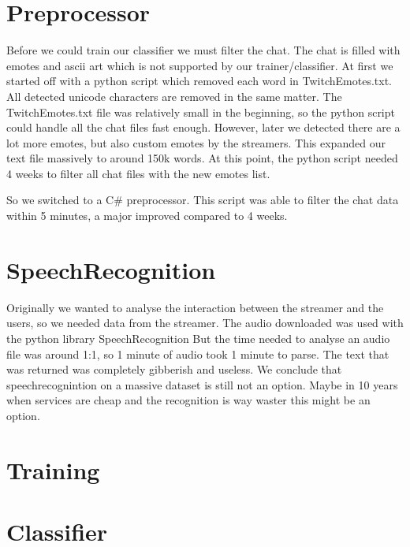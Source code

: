 \documentclass[final]{report}
\begin{document}
\section{Preprocessor}
Before we could train our classifier we must filter the chat. The chat is filled with emotes and ascii art which is not supported by our trainer/classifier.
At first we started off with a python script which removed each word in TwitchEmotes.txt. All detected unicode characters are removed in the same matter.
The TwitchEmotes.txt file was relatively small in the beginning, so the python script could handle all the chat files fast enough. However, later we detected there are a lot more emotes, but also custom emotes by the streamers.
This expanded our text file massively to around 150k words. At this point, the python script needed 4 weeks to filter all chat files with the new emotes list.

So we switched to a C# preprocessor.
This script was able to filter the chat data within 5 minutes, a major improved compared to 4 weeks.

\section{SpeechRecognition}
Originally we wanted to analyse the interaction between the streamer and the users, so we needed data from the streamer.
The audio downloaded was used with the python library SpeechRecognition %
But the time needed to analyse an audio file was around 1:1, so 1 minute of audio took 1 minute to parse. The text that was returned was completely gibberish and useless.
We conclude that speechrecognintion on a massive dataset is still not an option. Maybe in 10 years when services are cheap and the recognition is way waster this might be an option.

\section{Training}

\section{Classifier}
\end{document}
